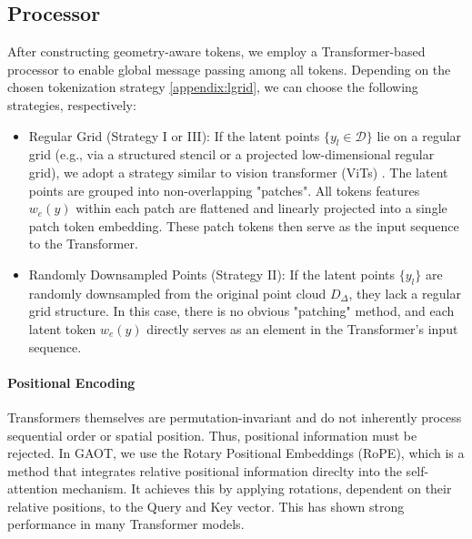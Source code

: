 \documentclass[reqno,10pt]{amsart}
\theoremstyle{plain}
\theoremstyle{definition}
\newcommand{\cal}[1]{\mathcal{#1}}
\begin{document}
\subsection{\bf Processor} \label{appendix:processor}
After constructing geometry-aware tokens, we employ a Transformer-based processor to enable global message passing among all tokens. Depending on the chosen tokenization strategy \ref{appendix:lgrid}, we can choose the following strategies, respectively:
\begin{itemize}\setlength{\itemsep}{0.8em}
    \item Regular Grid (Strategy I or III): If the latent points $\{y_l \in \cal D\}$ lie on a regular grid (e.g., via a structured stencil or a projected low-dimensional regular grid), we adopt a strategy similar to vision transformer (ViTs) \cite{AD2021}. The latent points are grouped into non-overlapping "patches". All tokens features $w_e(y)$ within each patch are flattened and linearly projected into a single patch token embedding. These patch tokens then serve as the input sequence to the Transformer.
    \item Randomly Downsampled Points (Strategy II): If the latent points $\{y_l\}$ are randomly downsampled from the original point cloud $D_\Delta$, they lack a regular grid structure. In this case, there is no obvious "patching" method, and each latent token $w_e(y)$ directly serves as an element in the Transformer's input sequence.
\end{itemize}
\paragraph{\bf Positional Encoding} Transformers themselves are permutation-invariant and do not inherently process sequential order or spatial position. Thus, positional information must be rejected. In GAOT, we use the Rotary Positional Embeddings (RoPE), which is a method that integrates relative positional information direclty into the self-attention mechanism. It achieves this by applying rotations, dependent on their relative positions, to the Query and Key vector. This has shown strong performance in many Transformer models.
\end{document}
